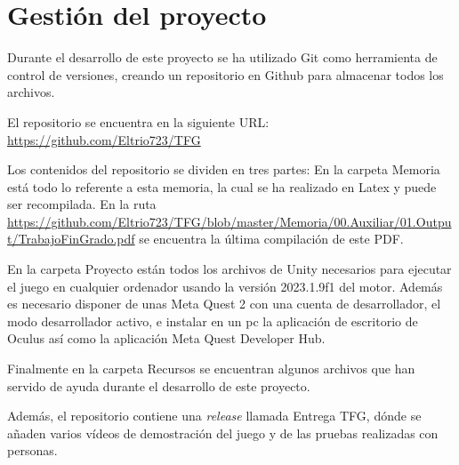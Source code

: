 

\pagestyle{fancy}
\fancyhead[LE,RO]{\thepage}
\fancyhead[LO]{\nouppercase{\rightmark}}

\label{sec:apendice:Proyecto}
\minitoc




\section{Gestión del proyecto}
Durante el desarrollo de este proyecto se ha utilizado Git como herramienta de control de versiones, creando un repositorio en Github para almacenar todos los archivos.

El repositorio se encuentra en la siguiente URL: \url{https://github.com/Eltrio723/TFG}

Los contenidos del repositorio se dividen en tres partes: 
En la carpeta Memoria está todo lo referente a esta memoria, la cual se ha realizado en Latex y puede ser recompilada. En la ruta \url{https://github.com/Eltrio723/TFG/blob/master/Memoria/00.Auxiliar/01.Output/TrabajoFinGrado.pdf} se encuentra la última compilación de este PDF.

En la carpeta Proyecto están todos los archivos de Unity necesarios para ejecutar el juego en cualquier ordenador usando la versión 2023.1.9f1 del motor. Además es necesario disponer de unas Meta Quest 2 con una cuenta de desarrollador, el modo desarrollador activo, e instalar en un pc la aplicación de escritorio de Oculus así como la aplicación Meta Quest Developer Hub.

Finalmente en la carpeta Recursos se encuentran algunos archivos que han servido de ayuda durante el desarrollo de este proyecto.


Además, el repositorio contiene una \textit{release} llamada Entrega TFG, dónde se añaden varios vídeos de demostración del juego y de las pruebas realizadas con personas.

\chapterend
